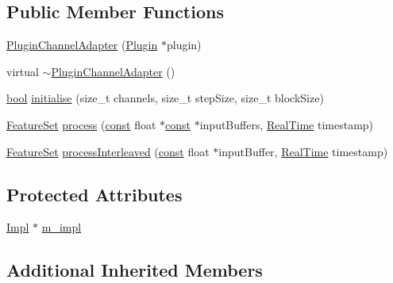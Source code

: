\subsection*{Public Member Functions}
\begin{DoxyCompactItemize}
\item 
\hyperlink{class_vamp_1_1_host_ext_1_1_plugin_channel_adapter_a2cda2b672708264f9a33c43bad3acdd8}{Plugin\+Channel\+Adapter} (\hyperlink{class_vamp_1_1_plugin}{Plugin} $\ast$plugin)
\item 
virtual \hyperlink{class_vamp_1_1_host_ext_1_1_plugin_channel_adapter_a7bd79ac5febc8d3c499e7339476c07b4}{$\sim$\+Plugin\+Channel\+Adapter} ()
\item 
\hyperlink{mac_2config_2i386_2lib-src_2libsoxr_2soxr-config_8h_abb452686968e48b67397da5f97445f5b}{bool} \hyperlink{class_vamp_1_1_host_ext_1_1_plugin_channel_adapter_ade0473c8fc54636431967cbf41649c1c}{initialise} (size\+\_\+t channels, size\+\_\+t step\+Size, size\+\_\+t block\+Size)
\item 
\hyperlink{class_vamp_1_1_plugin_a448fb57dc245d47923ec9eeaf9856c5f}{Feature\+Set} \hyperlink{class_vamp_1_1_host_ext_1_1_plugin_channel_adapter_a294e663b4d9ec885791faa1b440571ed}{process} (\hyperlink{getopt1_8c_a2c212835823e3c54a8ab6d95c652660e}{const} float $\ast$\hyperlink{getopt1_8c_a2c212835823e3c54a8ab6d95c652660e}{const} $\ast$input\+Buffers, \hyperlink{struct_vamp_1_1_real_time}{Real\+Time} timestamp)
\item 
\hyperlink{class_vamp_1_1_plugin_a448fb57dc245d47923ec9eeaf9856c5f}{Feature\+Set} \hyperlink{class_vamp_1_1_host_ext_1_1_plugin_channel_adapter_ab0f65bf25df3fcbea2b950119b6c69f0}{process\+Interleaved} (\hyperlink{getopt1_8c_a2c212835823e3c54a8ab6d95c652660e}{const} float $\ast$input\+Buffer, \hyperlink{struct_vamp_1_1_real_time}{Real\+Time} timestamp)
\end{DoxyCompactItemize}
\subsection*{Protected Attributes}
\begin{DoxyCompactItemize}
\item 
\hyperlink{class_vamp_1_1_host_ext_1_1_plugin_channel_adapter_1_1_impl}{Impl} $\ast$ \hyperlink{class_vamp_1_1_host_ext_1_1_plugin_channel_adapter_ae3a74a2e6c4cd33dce9f4248e73c6701}{m\+\_\+impl}
\end{DoxyCompactItemize}
\subsection*{Additional Inherited Members}


